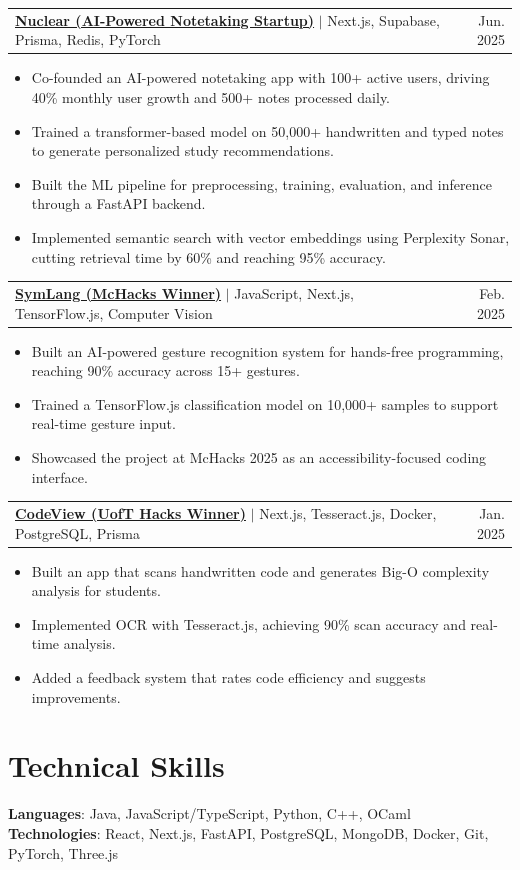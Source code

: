 \documentclass[a4,10pt]{article}
\makeatletter
\newcommand{\resumeItem}[1]{
  \item\small{
    {#1 \vspace{-2pt}}
  }
}
\newcommand{\resumeProjectHeading}[2]{
    \item
    \begin{tabular*}{0.97\textwidth}{l@{\extracolsep{\fill}}r}
      \small#1 & #2 \\
    \end{tabular*}\vspace{-7pt}
}
\newcommand{\resumeItemListStart}{\begin{itemize}}
\newcommand{\resumeItemListEnd}{\end{itemize}\vspace{-5pt}}
\makeatother
\begin{document}
\resumeProjectHeading
    {\href{https://nuclearapp.ca}{\textbf{Nuclear (AI-Powered Notetaking Startup)}} $|$ Next.js, Supabase, Prisma, Redis, PyTorch}{Jun. 2025}
    \resumeItemListStart
      \resumeItem{Co-founded an AI-powered notetaking app with 100+ active users, driving 40\% monthly user growth and 500+ notes processed daily.}
      \resumeItem{Trained a transformer-based model on 50,000+ handwritten and typed notes to generate personalized study recommendations.}
      \resumeItem{Built the ML pipeline for preprocessing, training, evaluation, and inference through a FastAPI backend.}
      \resumeItem{Implemented semantic search with vector embeddings using Perplexity Sonar, cutting retrieval time by 60\% and reaching 95\% accuracy.}
    \resumeItemListEnd



\resumeProjectHeading
    {\href{https://github.com/0jas0jas/symlang}{\textbf{SymLang (McHacks Winner)}} $|$ JavaScript, Next.js, TensorFlow.js, Computer Vision}{Feb. 2025}
    \resumeItemListStart
      \resumeItem{Built an AI-powered gesture recognition system for hands-free programming, reaching 90\% accuracy across 15+ gestures.}
      \resumeItem{Trained a TensorFlow.js classification model on 10,000+ samples to support real-time gesture input.}
      \resumeItem{Showcased the project at McHacks 2025 as an accessibility-focused coding interface.}
    \resumeItemListEnd

  \resumeProjectHeading
    {\href{https://github.com/0jas0jas/codeview}{\textbf{CodeView (UofT Hacks Winner)}} $|$ Next.js, Tesseract.js, Docker, PostgreSQL, Prisma}{Jan. 2025}
    \resumeItemListStart
      \resumeItem{Built an app that scans handwritten code and generates Big-O complexity analysis for students.}
      \resumeItem{Implemented OCR with Tesseract.js, achieving 90\% scan accuracy and real-time analysis.}
      \resumeItem{Added a feedback system that rates code efficiency and suggests improvements.}
    \resumeItemListEnd

\section{Technical Skills}
\begin{itemize}[leftmargin=0.15in, label={}]
    \small{\item{
     \textbf{Languages}{: Java, JavaScript/TypeScript, Python, C++, OCaml} \\
     \textbf{Technologies}{: React, Next.js, FastAPI, PostgreSQL, MongoDB, Docker, Git, PyTorch, Three.js}
    }}
\end{itemize}
\end{document}
